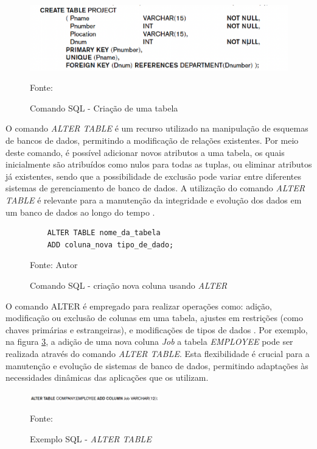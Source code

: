 \begin{figure}[h!]
    \centering
    \includegraphics{figuras/create_table_elmasi.eps}
    \caption{Comando SQL - Criação de uma tabela}
    Fonte: \cite{elmasri2011fundamentals}
    \label{fig:create_table}
\end{figure}



O comando \textit{ALTER TABLE} é um recurso utilizado na manipulação de esquemas de bancos de dados, permitindo a modificação de relações existentes. Por meio deste comando, é possível adicionar novos atributos a uma tabela, os quais inicialmente são atribuídos como nulos para todas as tuplas, ou eliminar atributos já existentes, sendo que a possibilidade de exclusão pode variar entre diferentes sistemas de gerenciamento de banco de dados. A utilização do comando \textit{ALTER TABLE} é relevante para a manutenção da integridade e evolução dos dados em um banco de dados ao longo do tempo \cite{silberschatz2011database}.


\begin{figure}[h!]
    \centering
    \begin{lstlisting}
    ALTER TABLE nome_da_tabela
    ADD coluna_nova tipo_de_dado;
    \end{lstlisting}
    \caption{Comando SQL - criação nova coluna usando \textit{ALTER}}
    Fonte: Autor
    \label{lst:sql_alter}
\end{figure}


O comando ALTER é empregado para realizar  operações como:  adição, modificação ou exclusão de colunas em uma tabela, ajustes em restrições (como chaves primárias e estrangeiras), e modificações de tipos de dados \cite{silberschatz2011database}. Por exemplo, na figura \ref{fig:alter_table}, a adição de uma nova coluna \textit{Job} a tabela \textit{EMPLOYEE} pode ser realizada através do comando \textit{ALTER TABLE}. Esta flexibilidade é crucial para a manutenção e evolução de sistemas de banco de dados, permitindo adaptações às necessidades dinâmicas das aplicações que os utilizam.

\begin{figure}[h!]
    \centering
    \includegraphics[width=0.5\textwidth]{figuras/alter_table_elmasi.eps}
    \caption{Exemplo SQL - \textit{ALTER TABLE}}
    Fonte: \cite{elmasri2011fundamentals}
    \label{fig:alter_table}
\end{figure}


